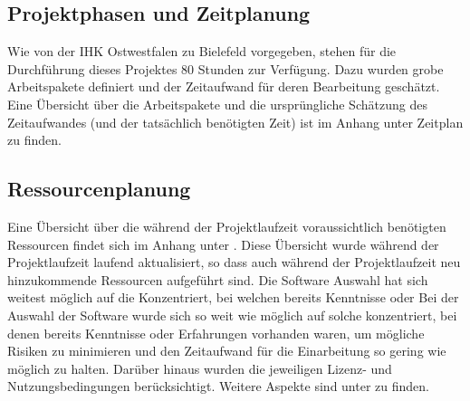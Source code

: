 \subsection{Projektphasen und Zeitplanung}

Wie von der IHK Ostwestfalen zu Bielefeld vorgegeben, stehen für die Durchführung dieses Projektes 80 Stunden zur Verfügung. Dazu wurden grobe Arbeitspakete definiert und der Zeitaufwand für deren Bearbeitung geschätzt. Eine Übersicht über die Arbeitspakete und die ursprüngliche Schätzung des Zeitaufwandes (und der tatsächlich benötigten Zeit) ist im Anhang unter Zeitplan  zu finden.


\subsection{Ressourcenplanung}

Eine Übersicht über die während der Projektlaufzeit voraussichtlich benötigten Ressourcen findet sich im Anhang unter . Diese Übersicht wurde während der Projektlaufzeit laufend aktualisiert, so dass auch während der Projektlaufzeit neu hinzukommende Ressourcen aufgeführt sind.
Die Software Auswahl hat sich weitest möglich auf die Konzentriert, bei welchen bereits Kenntnisse oder Bei der Auswahl der Software wurde sich so weit wie möglich auf solche konzentriert, bei denen bereits Kenntnisse oder Erfahrungen vorhanden waren, um mögliche Risiken zu minimieren und den Zeitaufwand für die Einarbeitung so gering wie möglich zu halten. Darüber hinaus wurden die jeweiligen Lizenz- und Nutzungsbedingungen berücksichtigt. Weitere Aspekte sind unter  zu finden.
